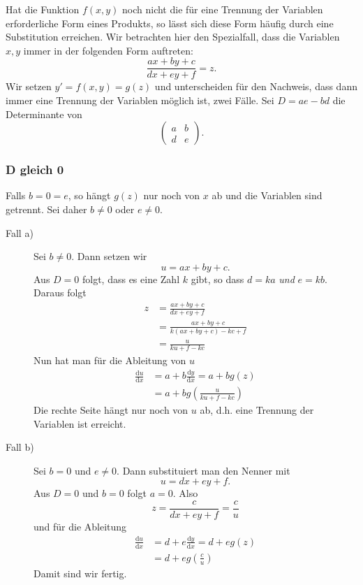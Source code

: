 \documentclass[%
11pt,%
twoside,%
titlepage,%
german,%
headsepline%
]{scrartcl}
\begin{document}
Hat die Funktion $f(x,y)$ noch nicht die f\"ur eine Trennung der Variablen erforderliche Form eines Produkts, so l\"asst sich diese Form h\"aufig durch eine Substitution erreichen. Wir betrachten hier den Spezialfall, dass die Variablen $x,y$ immer in der folgenden Form auftreten:
$$\frac{ax+by+c}{dx+ey+f}=z.$$
Wir setzen $y'=f(x,y)=g(z)$ und unterscheiden f\"ur den Nachweis, dass dann immer eine Trennung der Variablen m\"oglich ist, zwei F\"alle. Sei $D=ae-bd$ die Determinante von
$$\begin{pmatrix}
a & b\\
d & e
\end{pmatrix}.$$

\subsubsection{D gleich 0}

Falls $b=0=e$, so h\"angt $g(z)$ nur noch von $x$ ab und die Variablen sind getrennt. Sei daher $b\neq0$ oder $e\neq0$.

\begin{description}
\item[Fall a)] Sei $b\neq0$. Dann setzen wir
$$u=ax+by+c.$$
Aus $D=0$ folgt, dass es eine Zahl $k$ gibt, so dass $d=ka$ \emph{und} $e=kb$. Daraus folgt
\begin{align*}
z &= \frac{ax+by+c}{dx+ey+f}\\
 &= \frac{ax+by+c}{k(ax+by+c)-kc+f}\\
 &= \frac{u}{ku+f-kc}
 \end{align*}
 Nun hat man f\"ur die Ableitung von $u$
\begin{align*}
\frac{\mathrm{d}u}{\mathrm{d}x}&=a+b\frac{\mathrm{d}y}{\mathrm{d}x}=a+bg(z)\\
&=a+bg\left(\frac{u}{ku+f-kc}\right)
\end{align*}
 Die rechte Seite h\"angt nur noch von $u$ ab, d.h. eine Trennung der Variablen ist erreicht.
 \item[Fall b)] Sei $b=0$ und $e\neq0$. Dann substituiert man den Nenner mit
 $$u=dx+ey+f.$$
 Aus $D=0$ und $b=0$ folgt $a=0$. Also
 $$z=\frac{c}{dx+ey+f}=\frac{c}{u}$$
 und f\"ur die Ableitung
\begin{align*}
\frac{\mathrm{d}u}{\mathrm{d}x}&=d+e\frac{\mathrm{d}y}{\mathrm{d}x}=d+eg(z)\\
&=d+eg\left(\frac{c}{u}\right)
\end{align*}
Damit sind wir fertig.
 \end{description}
 
\end{document}
